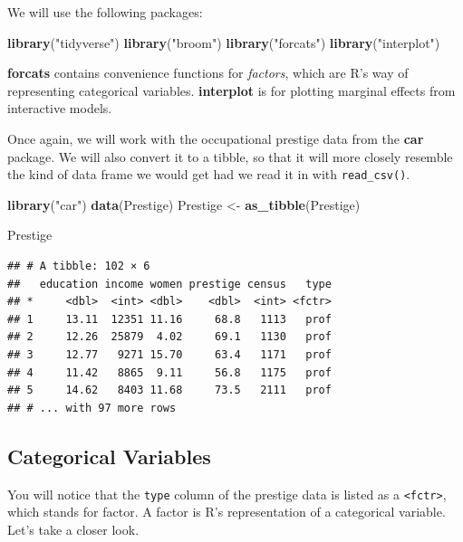 \documentclass[12pt,oneside,openany]{book}
\newenvironment{Shaded}{\begin{snugshade}}{\end{snugshade}}
\newcommand{\KeywordTok}[1]{\textcolor[rgb]{0.13,0.29,0.53}{\textbf{{#1}}}}
\newcommand{\StringTok}[1]{\textcolor[rgb]{0.31,0.60,0.02}{{#1}}}
\newcommand{\NormalTok}[1]{{#1}}
\begin{document}
We will use the following packages:

\begin{Shaded}
\begin{Highlighting}[]
\KeywordTok{library}\NormalTok{(}\StringTok{"tidyverse"}\NormalTok{)}
\KeywordTok{library}\NormalTok{(}\StringTok{"broom"}\NormalTok{)}
\KeywordTok{library}\NormalTok{(}\StringTok{"forcats"}\NormalTok{)}
\KeywordTok{library}\NormalTok{(}\StringTok{"interplot"}\NormalTok{)}
\end{Highlighting}
\end{Shaded}

\textbf{forcats} contains convenience functions for \emph{factors},
which are R's way of representing categorical variables.
\textbf{interplot} is for plotting marginal effects from interactive
models.

Once again, we will work with the occupational prestige data from the
\textbf{car} package. We will also convert it to a tibble, so that it
will more closely resemble the kind of data frame we would get had we
read it in with \texttt{read\_csv()}.

\begin{Shaded}
\begin{Highlighting}[]
\KeywordTok{library}\NormalTok{(}\StringTok{"car"}\NormalTok{)}
\KeywordTok{data}\NormalTok{(Prestige)}
\NormalTok{Prestige <-}\StringTok{ }\KeywordTok{as_tibble}\NormalTok{(Prestige)}

\NormalTok{Prestige}
\end{Highlighting}
\end{Shaded}

\begin{verbatim}
## # A tibble: 102 × 6
##   education income women prestige census   type
## *     <dbl>  <int> <dbl>    <dbl>  <int> <fctr>
## 1     13.11  12351 11.16     68.8   1113   prof
## 2     12.26  25879  4.02     69.1   1130   prof
## 3     12.77   9271 15.70     63.4   1171   prof
## 4     11.42   8865  9.11     56.8   1175   prof
## 5     14.62   8403 11.68     73.5   2111   prof
## # ... with 97 more rows
\end{verbatim}

\subsection{Categorical Variables}\label{categorical-variables-1}

You will notice that the \texttt{type} column of the prestige data is
listed as a \texttt{\textless{}fctr\textgreater{}}, which stands for
factor. A factor is R's representation of a categorical variable. Let's
take a closer look.
\end{document}

